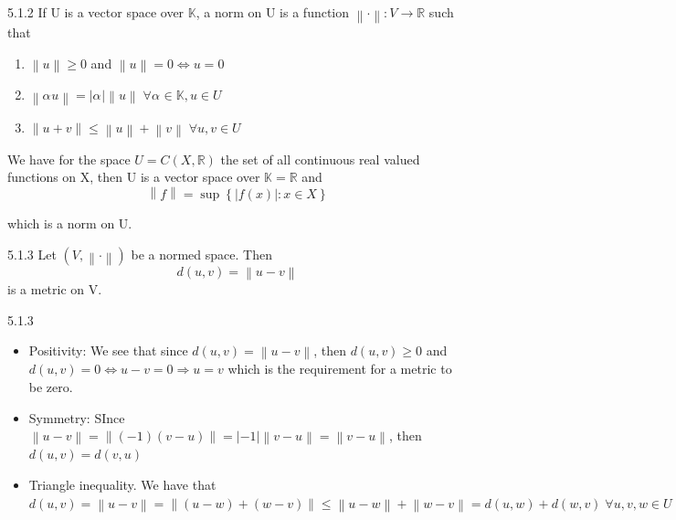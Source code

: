 \documentclass[a4paper,norsk]{article}
\renewcommand{\geq}{\geqslant}
\renewcommand{\leq}{\leqslant}
\begin{document}
\begin{definitionbox}{5.1.2}{}
If U is a vector space over $ \mathbb{K}  $, a norm on U is a function $ \left\lVert \cdot \right\rVert : V \to \mathbb{R} $ such that
\begin{enumerate}
    \item $ \left\lVert u \right\rVert \geq 0  $ and $ \left\lVert u \right\rVert = 0 \iff u = 0 $  
    \item $ \left\lVert \alpha_{}^{} u \right\rVert = \left| \alpha_{}^{}  \right| \left\lVert u \right\rVert   \; \forall  \alpha_{}^{} \in \mathbb{K} , u \in U $ 
    \item $ \left\lVert u + v \right\rVert \leq \left\lVert u \right\rVert + \left\lVert v \right\rVert \; \forall u, v \in U $ 
\end{enumerate}
\end{definitionbox}


We have for the space $ U = C \left( X, \mathbb{R} \right)  $ the set of all continuous real valued functions on X, then U is a vector space over $ \mathbb{K}  = \mathbb{R} $ and
\[
    \left\lVert f \right\rVert = \sup \left\{ \left| f(x) \right| : x \in X  \right\} 
\]

which is a norm on U.


\begin{propositionbox}{5.1.3}{}
Let $ \left( V, \left\lVert \cdot \right\rVert  \right)  $ be a normed space. Then
\[
    d \left( u, v \right) = \left\lVert u -v  \right\rVert 
\]
is a metric on V.

\begin{proofbox}{5.1.3}{}
    \begin{itemize}
        \item Positivity: We see that since $ d \left( u, v \right) = \left\lVert u - v \right\rVert  $, then $ d \left( u, v \right) \geq  0 $ and $ d \left( u, v \right) = 0 \iff u - v = 0 \Rightarrow u = v $ which is the requirement for a metric to be zero.
        \item Symmetry: SInce $ \left\lVert u - v \right\rVert = \left\lVert \left( -1 \right) \left( v - u \right)  \right\rVert = \left| -1 \right| \left\lVert v - u \right\rVert = \left\lVert v - u \right\rVert  $, then $ d \left( u, v \right) = d \left( v, u \right)  $   
        \item Triangle inequality. We have that $ d \left( u, v \right) = \left\lVert u - v \right\rVert = \left\lVert \left( u - w \right) + \left( w - v \right)  \right\rVert \leq  \left\lVert u -  w\right\rVert + \left\lVert w - v \right\rVert = d \left( u, w \right) + d \left( w, v \right)  \; \forall u, v , w \in  U$ 
    \end{itemize}
\end{proofbox}
\end{propositionbox}
\end{document}
